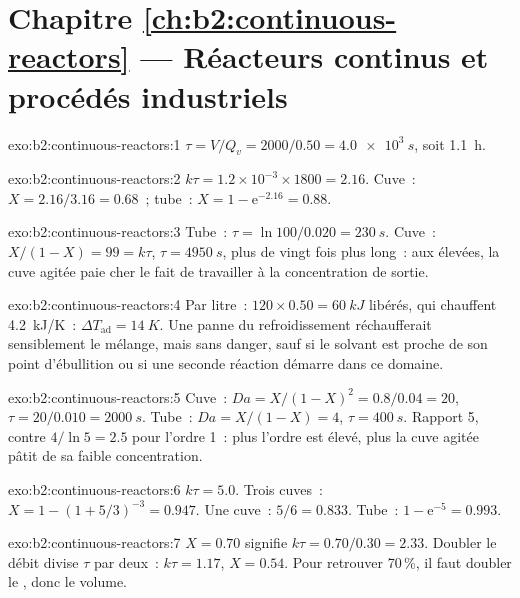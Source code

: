 \section*{Chapitre \ref{ch:b2:continuous-reactors} --- Réacteurs continus et procédés industriels}

\begin{solution}{exo:b2:continuous-reactors:1}
$\tau = V/Q_v = 2000/0.50 = \qty{4.0e3}{s}$, soit \qty{1.1}{h}.
\end{solution}

\begin{solution}{exo:b2:continuous-reactors:2}
$k\tau = 1.2 \times 10^{-3} \times 1800 = 2.16$. Cuve~: $X = 2.16/3.16 = 0.68$~;
tube~: $X = 1 - \mathrm e^{-2.16} = 0.88$.
\end{solution}

\begin{solution}{exo:b2:continuous-reactors:3}
Tube~: $\tau = \ln 100/0.020 = \qty{230}{s}$. Cuve~: $X/(1 - X) = 99 = k\tau$,
$\tau = \qty{4950}{s}$, plus de vingt fois plus long~: aux  élevées, la
cuve agitée paie cher le fait de travailler à la concentration de sortie.
\end{solution}

\begin{solution}{exo:b2:continuous-reactors:4}
Par litre~: $120 \times 0.50 = \qty{60}{kJ}$ libérés, qui chauffent
\qty{4.2}{kJ/K}~: $\Delta T_{\text{ad}} = \qty{14}{K}$. Une panne du refroidissement
réchaufferait sensiblement le mélange, mais sans danger, sauf si le solvant est
proche de son point d'ébullition ou si une seconde réaction démarre dans ce domaine.
\end{solution}

\begin{solution}{exo:b2:continuous-reactors:5}
Cuve~: $Da = X/(1 - X)^2 = 0.8/0.04 = 20$, $\tau = 20/0.010 = \qty{2000}{s}$.
Tube~: $Da = X/(1 - X) = 4$, $\tau = \qty{400}{s}$. Rapport 5, contre $4/\ln 5 =
2.5$ pour l'ordre 1~: plus l'ordre est élevé, plus la cuve agitée pâtit
de sa faible concentration.
\end{solution}

\begin{solution}{exo:b2:continuous-reactors:6}
$k\tau = 5.0$. Trois cuves~: $X = 1 - (1 + 5/3)^{-3} = 0.947$. Une cuve~: $5/6 =
0.833$. Tube~: $1 - \mathrm e^{-5} = 0.993$.
\end{solution}

\begin{solution}{exo:b2:continuous-reactors:7}
$X = 0.70$ signifie $k\tau = 0.70/0.30 = 2.33$. Doubler le débit divise $\tau$ par deux~:
$k\tau = 1.17$, $X = 0.54$. Pour retrouver 70\,\%, il faut doubler le , donc le
volume.
\end{solution}

